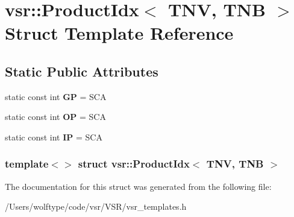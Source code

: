 \hypertarget{structvsr_1_1_product_idx_3_01_t_n_v_00_01_t_n_b_01_4}{\section{vsr\-:\-:Product\-Idx$<$ T\-N\-V, T\-N\-B $>$ Struct Template Reference}
\label{structvsr_1_1_product_idx_3_01_t_n_v_00_01_t_n_b_01_4}
}
\subsection*{Static Public Attributes}
\begin{DoxyCompactItemize}
\item 
\hypertarget{structvsr_1_1_product_idx_3_01_t_n_v_00_01_t_n_b_01_4_a0159a4e21a79857a2e1103d7f8b0af9a}{static const int {\bfseries G\-P} = S\-C\-A}\label{structvsr_1_1_product_idx_3_01_t_n_v_00_01_t_n_b_01_4_a0159a4e21a79857a2e1103d7f8b0af9a}

\item 
\hypertarget{structvsr_1_1_product_idx_3_01_t_n_v_00_01_t_n_b_01_4_a0041ae94533dc965555b5b7b52fcf24d}{static const int {\bfseries O\-P} = S\-C\-A}\label{structvsr_1_1_product_idx_3_01_t_n_v_00_01_t_n_b_01_4_a0041ae94533dc965555b5b7b52fcf24d}

\item 
\hypertarget{structvsr_1_1_product_idx_3_01_t_n_v_00_01_t_n_b_01_4_a54da6681bb816609dec0ce8032b7c725}{static const int {\bfseries I\-P} = S\-C\-A}\label{structvsr_1_1_product_idx_3_01_t_n_v_00_01_t_n_b_01_4_a54da6681bb816609dec0ce8032b7c725}

\end{DoxyCompactItemize}
\subsubsection*{template$<$$>$ struct vsr\-::\-Product\-Idx$<$ T\-N\-V, T\-N\-B $>$}



The documentation for this struct was generated from the following file\-:\begin{DoxyCompactItemize}
\item 
/\-Users/wolftype/code/vsr/\-V\-S\-R/vsr\-\_\-templates.\-h\end{DoxyCompactItemize}
